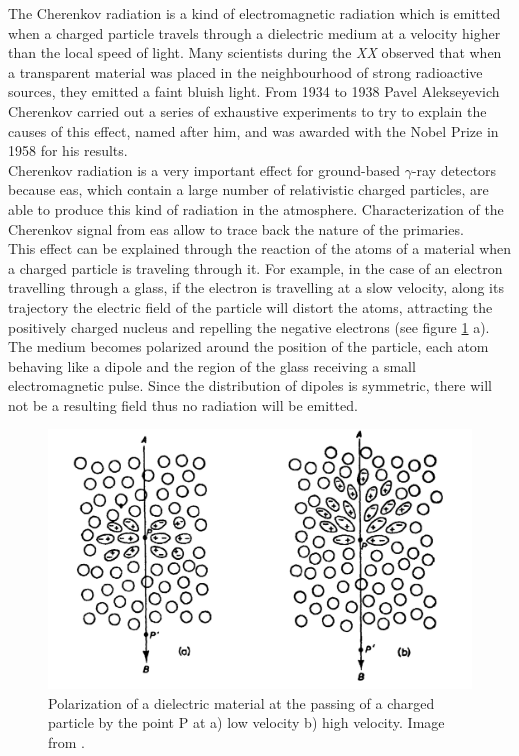 \documentclass[main.tex]{subfiles}
\begin{document}
The Cherenkov radiation is a kind of electromagnetic radiation which is emitted when a charged particle travels through a dielectric medium at a velocity higher than the local speed of light. Many scientists during the \textit{XX}  observed that when a transparent material was placed in the neighbourhood of strong radioactive sources, they emitted a faint bluish light. From 1934 to 1938 Pavel Alekseyevich Cherenkov carried out a series of exhaustive experiments to try to explain the causes of this effect, named after him, and was awarded with the Nobel Prize in 1958 for his results.\\
Cherenkov radiation is a very important effect for ground-based $\gamma$-ray detectors because \gls{eas}, which contain a large number of relativistic charged particles, are able to produce this kind of radiation in the atmosphere. Characterization of the Cherenkov signal from \gls{eas} allow to trace back the nature of the primaries.\\
This effect can be explained through the reaction of the atoms of a material when a charged particle is traveling through it. For example, in the case of an electron travelling through a glass, if the electron is travelling at a slow velocity, along its trajectory the electric field of the particle will distort the atoms, attracting the positively charged nucleus and repelling the negative electrons (see figure \ref{fig:polarization} a). The medium becomes polarized around the position of the particle, each atom behaving like a dipole and the region of the glass receiving a small electromagnetic pulse. Since the distribution of dipoles  is symmetric, there will not be a resulting field thus no radiation will be emitted.

\begin{figure}
    \centering
    \includegraphics[width=1\textwidth]{Pictures/polarization.pdf}
    \caption{Polarization of a dielectric material at the passing of a charged particle by the point P at a) low velocity b) high velocity. Image from \cite{jelley1958Cherenkov}.}
    \label{fig:polarization}
\end{figure}
\end{document}
